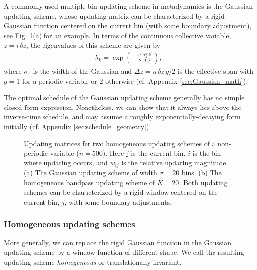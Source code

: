 \documentclass[reprint, superscriptaddress, floatfix]{revtex4-1}
\begin{document}
A commonly-used multiple-bin updating scheme in metadynamics
is the Gaussian updating scheme,
whose updating matrix can be characterized by
a rigid Gaussian function centered on the current bin
(with some boundary adjustment),
see Fig. \ref{fig:mat}(a) for an example.
%
In terms of the continuous collective variable, $z = i \, \delta z$,
the eigenvalues of this scheme are given by\cite{bussi2006}
\begin{align}
  \lambda_k
  =
  \exp\left(
        -
        \frac{ \pi^2 \, \sigma_z^2 \, k^2 }
             { 2 \, \Delta z^2 }
      \right)
  ,
  \label{eq:lambda_Gaussian}
\end{align}
where $\sigma_z$ is the width of the Gaussian
and $\Delta z = n \, \delta z \, g/2$
is the effective span
with $g = 1$ for a periodic variable or $2$ otherwise
(cf. Appendix \ref{sec:Gaussian_math}).

The optimal schedule of the Gaussian updating scheme
generally has no simple closed-form expression.
Nonetheless, we can show that it always lies above
the inverse-time schedule,
and may assume a roughly exponentially-decaying form
initially (cf. Appendix \ref{sec:schedule_geometry}).

\begin{figure}[h]\centering
  \caption{
    \label{fig:mat}
    Updating matrices for two
    homogeneous updating schemes of
    a non-periodic variable ($n = 500$).
    Here $j$ is the current bin,
    $i$ is the bin where updating occurs,
    and $w_{ij}$ is the relative updating magnitude.
    (a) The Gaussian updating scheme of width $\sigma = 20$ bins.
    (b) The homogeneous bandpass updating scheme of $K = 20$.
    Both updating schemes
    can be characterized by a rigid window
    centered on the current bin, $j$,
    with some boundary adjustments.
  }
\end{figure}



\subsubsection{\label{sec:homo_scheme}
Homogeneous updating schemes}


More generally, we can replace the rigid Gaussian function
in the Gaussian updating scheme
by a window function of different shape.
%
We call the resulting updating scheme
\emph{homogeneous} or
translationally-invariant.
\end{document}
